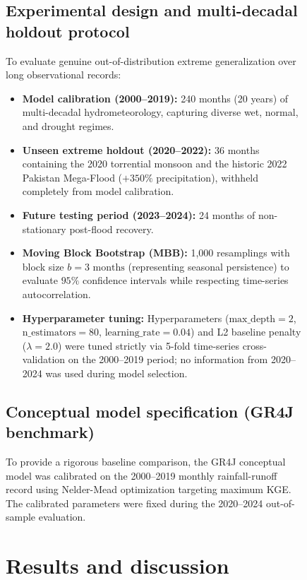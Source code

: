 \documentclass[11pt,a4paper,fleqn]{article}
\begin{document}
\begin{figure}[htbp]
\subsection{Experimental design and multi-decadal holdout protocol}
To evaluate genuine out-of-distribution extreme generalization over long observational records:
\begin{itemize}
    \item \textbf{Model calibration (2000--2019):} 240 months (20 years) of multi-decadal hydrometeorology, capturing diverse wet, normal, and drought regimes.
    \item \textbf{Unseen extreme holdout (2020--2022):} 36 months containing the 2020 torrential monsoon and the historic 2022 Pakistan Mega-Flood ($+350\%$ precipitation), withheld completely from model calibration.
    \item \textbf{Future testing period (2023--2024):} 24 months of non-stationary post-flood recovery.
    \item \textbf{Moving Block Bootstrap (MBB):} 1,000 resamplings with block size $b = 3\text{ months}$ (representing seasonal persistence) to evaluate $95\%$ confidence intervals while respecting time-series autocorrelation.
    \item \textbf{Hyperparameter tuning:} Hyperparameters ($\text{max\_depth} = 2$, $\text{n\_estimators} = 80$, $\text{learning\_rate} = 0.04$) and L2 baseline penalty ($\lambda = 2.0$) were tuned strictly via 5-fold time-series cross-validation on the 2000--2019 period; no information from 2020--2024 was used during model selection.
\end{itemize}

\subsection{Conceptual model specification (GR4J benchmark)}
To provide a rigorous baseline comparison, the GR4J conceptual model \citep{perrin2003improvement} was calibrated on the 2000--2019 monthly rainfall-runoff record using Nelder-Mead optimization targeting maximum KGE. The calibrated parameters were fixed during the 2020--2024 out-of-sample evaluation.

\section{Results and discussion}


\end{figure}
\end{document}
